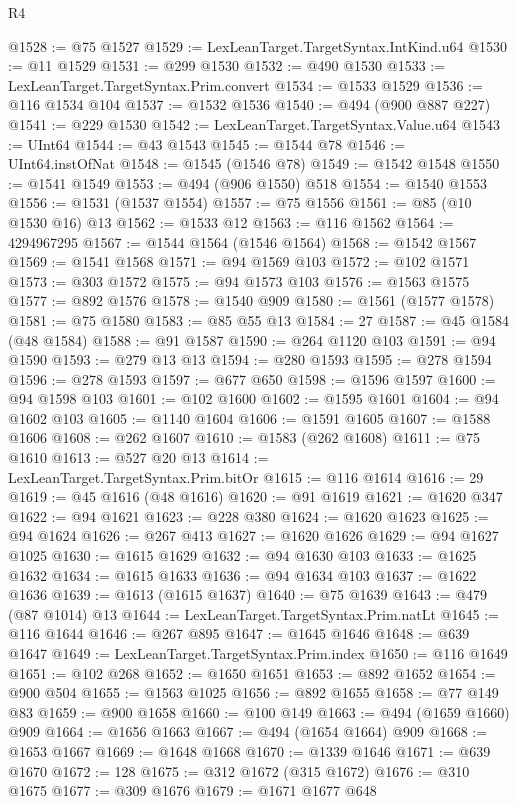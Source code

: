 \begin{lexlean}{R4}
\begin{coremodule}
@1528 := @75 @1527
@1529 := LexLeanTarget.TargetSyntax.IntKind.u64
@1530 := @11 @1529
@1531 := @299 @1530
@1532 := @490 @1530
@1533 := LexLeanTarget.TargetSyntax.Prim.convert
@1534 := @1533 @1529
@1536 := @116 @1534 @104
@1537 := @1532 @1536
@1540 := @494 (@900 @887 @227)
@1541 := @229 @1530
@1542 := LexLeanTarget.TargetSyntax.Value.u64
@1543 := UInt64
@1544 := @43 @1543
@1545 := @1544 @78
@1546 := UInt64.instOfNat
@1548 := @1545 (@1546 @78)
@1549 := @1542 @1548
@1550 := @1541 @1549
@1553 := @494 (@906 @1550) @518
@1554 := @1540 @1553
@1556 := @1531 (@1537 @1554)
@1557 := @75 @1556
@1561 := @85 (@10 @1530 @16) @13
@1562 := @1533 @12
@1563 := @116 @1562
@1564 := 4294967295
@1567 := @1544 @1564 (@1546 @1564)
@1568 := @1542 @1567
@1569 := @1541 @1568
@1571 := @94 @1569 @103
@1572 := @102 @1571
@1573 := @303 @1572
@1575 := @94 @1573 @103
@1576 := @1563 @1575
@1577 := @892 @1576
@1578 := @1540 @909
@1580 := @1561 (@1577 @1578)
@1581 := @75 @1580
@1583 := @85 @55 @13
@1584 := 27
@1587 := @45 @1584 (@48 @1584)
@1588 := @91 @1587
@1590 := @264 @1120 @103
@1591 := @94 @1590
@1593 := @279 @13 @13
@1594 := @280 @1593
@1595 := @278 @1594
@1596 := @278 @1593
@1597 := @677 @650
@1598 := @1596 @1597
@1600 := @94 @1598 @103
@1601 := @102 @1600
@1602 := @1595 @1601
@1604 := @94 @1602 @103
@1605 := @1140 @1604
@1606 := @1591 @1605
@1607 := @1588 @1606
@1608 := @262 @1607
@1610 := @1583 (@262 @1608)
@1611 := @75 @1610
@1613 := @527 @20 @13
@1614 := LexLeanTarget.TargetSyntax.Prim.bitOr
@1615 := @116 @1614
@1616 := 29
@1619 := @45 @1616 (@48 @1616)
@1620 := @91 @1619
@1621 := @1620 @347
@1622 := @94 @1621
@1623 := @228 @380
@1624 := @1620 @1623
@1625 := @94 @1624
@1626 := @267 @413
@1627 := @1620 @1626
@1629 := @94 @1627 @1025
@1630 := @1615 @1629
@1632 := @94 @1630 @103
@1633 := @1625 @1632
@1634 := @1615 @1633
@1636 := @94 @1634 @103
@1637 := @1622 @1636
@1639 := @1613 (@1615 @1637)
@1640 := @75 @1639
@1643 := @479 (@87 @1014) @13
@1644 := LexLeanTarget.TargetSyntax.Prim.natLt
@1645 := @116 @1644
@1646 := @267 @895
@1647 := @1645 @1646
@1648 := @639 @1647
@1649 := LexLeanTarget.TargetSyntax.Prim.index
@1650 := @116 @1649
@1651 := @102 @268
@1652 := @1650 @1651
@1653 := @892 @1652
@1654 := @900 @504
@1655 := @1563 @1025
@1656 := @892 @1655
@1658 := @77 @149 @83
@1659 := @900 @1658
@1660 := @100 @149
@1663 := @494 (@1659 @1660) @909
@1664 := @1656 @1663
@1667 := @494 (@1654 @1664) @909
@1668 := @1653 @1667
@1669 := @1648 @1668
@1670 := @1339 @1646
@1671 := @639 @1670
@1672 := 128
@1675 := @312 @1672 (@315 @1672)
@1676 := @310 @1675
@1677 := @309 @1676
@1679 := @1671 @1677 @648

\end{coremodule}
\end{lexlean}
